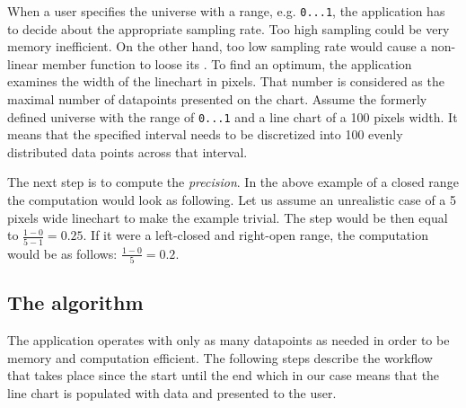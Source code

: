 \documentclass[12pt,a4paper,titlepage,final]{article}
\begin{document}
 When a user specifies the universe with a range, e.g. \texttt{0...1}, the application has to decide about the appropriate sampling rate. Too high sampling could be very memory inefficient. On the other hand, too low sampling rate would cause a non-linear member function to loose its . To find an optimum, the application examines the width of the linechart in pixels. That number is considered as the maximal number of datapoints presented on the chart. Assume the formerly defined universe with the range of \texttt{0...1} and a line chart of a 100 pixels width. It means that the specified interval needs to be discretized into 100 evenly distributed data points across that interval.
 
 The next step is to compute the \textit{precision}. In the above example of a closed range the computation would look as following. Let us assume an unrealistic case of a 5 pixels wide linechart to make the example trivial. The step would be then equal to $\frac{1 - 0}{5 - 1} = 0.25$. If it were a left-closed and right-open range, the computation would be as follows: $\frac{1 - 0}{5} = 0.2$.
 
 \subsection{The algorithm}
 The application operates with only as many datapoints as needed in order to be memory and computation efficient. The following steps describe the workflow that takes place since the start until the end which in our case means that the line chart is populated with data and presented to the user.
 
\end{document}

